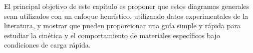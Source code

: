 \begin{table}[h!]
    \centering
    \caption{Ejemplo de dos materiales, A y B, caracterizados por sus coeficientes 
    de difusión, sus constantes cinéticas y sus tamaños.}
    \setlength\extrarowheight{2pt}
    \label{t:ab}
\end{table}

El principal objetivo de este capítulo es proponer que estos diagramas generales 
sean utilizados con un enfoque heurístico, utilizando datos experimentales de la
literatura, y mostrar que pueden proporcionar una guía simple y rápida para 
estudiar la cinética y el comportamiento de materiales específicos bajo 
condiciones de carga rápida.
